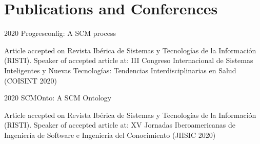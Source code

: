 \documentclass[american]{cv-class}
\begin{document}
\section{Publications and Conferences}
\begin{entrylist}
	\entry
	{2020}
	{Progresconfig: A SCM process}
	{ }
	{Article accepted on Revista Ibérica de Sistemas y Tecnologías de la Información (RISTI). Speaker of accepted article at: III Congreso Internacional de Sistemas Inteligentes y Nuevas Tecnologías: Tendencias Interdisciplinarias en Salud (COISINT 2020)
		    
		{\href{https://drive.google.com/file/d/1UAspvy3NgSpDMQh68TYh3A5M1i-WkCWU/view?usp=sharing}{}}
	}
	
	\entry
	{2020}
	{SCMOnto: A SCM Ontology}
	{ }
	{Article accepted on Revista Ibérica de Sistemas y Tecnologías de la Información (RISTI). Speaker of accepted article at: XV Jornadas Iberoamericanas de Ingeniería de Software e Ingeniería del Conocimiento (JIISIC 2020)
		    
}
\end{entrylist}
\end{document}
